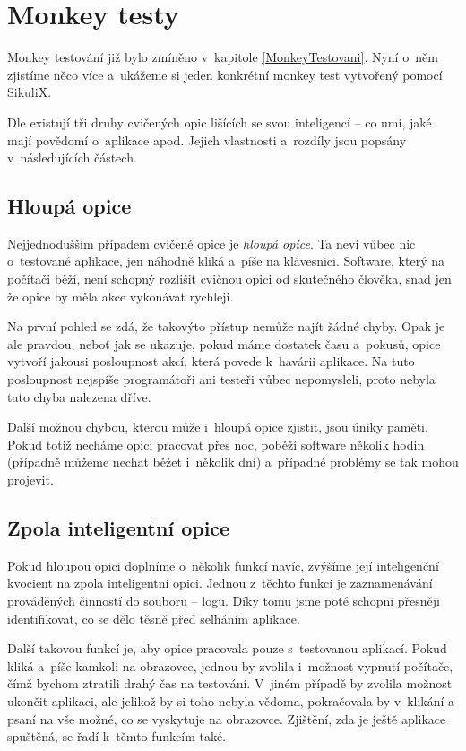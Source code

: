 \chapter{Monkey testy}
Monkey testování již bylo zmíněno v~kapitole \ref{MonkeyTestovani}. Nyní o~něm zjistíme něco více a~ukážeme si jeden konkrétní monkey test vytvořený pomocí SikuliX.

Dle \citep{Patton} existují tři druhy cvičených opic lišících se svou inteligencí -- co umí, jaké mají povědomí o~aplikace apod. Jejich vlastnosti a~rozdíly jsou popsány v~následujících částech.

	\section{Hloupá opice}
	Nejjednodušším případem cvičené opice je \emph{hloupá opice}. Ta neví vůbec nic o~testované aplikace, jen náhodně kliká a~píše na klávesnici. Software, který na počítači běží, není schopný rozlišit cvičnou opici od skutečného člověka, snad jen že opice by měla akce vykonávat rychleji.
	
	Na první pohled se zdá, že takovýto přístup nemůže najít žádné chyby. Opak je ale pravdou, neboť jak se ukazuje, pokud máme dostatek času a~pokusů, opice vytvoří jakousi posloupnost akcí, která povede k~havárii aplikace. Na tuto posloupnost nejspíše programátoři ani testeři vůbec nepomysleli, proto nebyla tato chyba nalezena dříve.
	
	Další možnou chybou, kterou může i~hloupá opice zjistit, jsou úniky paměti. Pokud totiž necháme opici pracovat přes noc, poběží software několik hodin (případně můžeme nechat běžet i~několik dní) a~případné problémy se tak mohou projevit.
	
	\section{Zpola inteligentní opice}
	Pokud hloupou opici doplníme o~několik funkcí navíc, zvýšíme její inteligenční kvocient na zpola inteligentní opici. Jednou z~těchto funkcí je zaznamenávání prováděných činností do souboru -- logu. Díky tomu jsme poté schopni přesněji identifikovat, co se dělo těsně před selháním aplikace.
	
	Další takovou funkcí je, aby opice pracovala pouze s~testovanou aplikací. Pokud kliká a~píše kamkoli na obrazovce, jednou by zvolila i~možnost vypnutí počítače, čímž bychom ztratili drahý čas na testování. V~jiném případě by zvolila možnost ukončit aplikaci, ale jelikož by si toho nebyla vědoma, pokračovala by v~klikání a psaní na vše možné, co se vyskytuje na obrazovce. Zjištění, zda je ještě aplikace spuštěná, se řadí k~těmto funkcím také.
	
